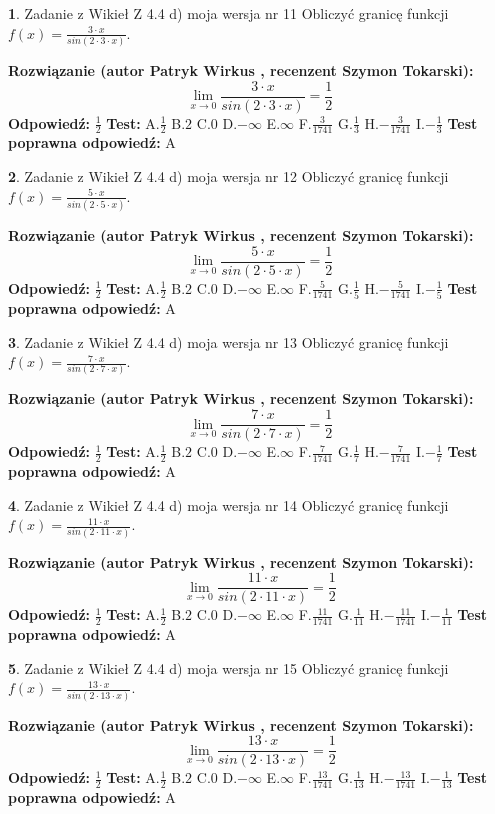 \documentclass[12pt, a4paper]{article}
\theoremstyle{definition} %
\newtheorem{zad}{}
\newcommand{\zadStart}[1]{\begin{zad}#1\newline}
\newcommand{\zadStop}{\end{zad}}
\newcommand{\rozwStart}[2]{\noindent \textbf{Rozwiązanie (autor #1 , recenzent #2): }\newline}
\newcommand{\rozwStop}{\newline}
\newcommand{\odpStart}{\noindent \textbf{Odpowiedź:}\newline}
\newcommand{\odpStop}{\newline}
\newcommand{\testStart}{\noindent \textbf{Test:}\newline}
\newcommand{\testStop}{\newline}
\newcommand{\kluczStart}{\noindent \textbf{Test poprawna odpowiedź:}\newline}
\newcommand{\kluczStop}{\newline}
\begin{document}
\zadStart{Zadanie z Wikieł Z 4.4 d) moja wersja nr 11}
Obliczyć granicę funkcji $f(x)=\frac{3\cdot x}{sin(2 \cdot3\cdot x)}$.
\zadStop
\rozwStart{Patryk Wirkus}{Szymon Tokarski}
$$\lim\limits_{x\to 0}\frac{3\cdot x}{sin(2 \cdot3\cdot x)}=\frac{1}{2}$$
\rozwStop
\odpStart
$\frac{1}{2}$
\odpStop
\testStart
A.$\frac{1}{2}$
B.$2$
C.$0$
D.$-\infty$
E.$\infty$
F.$\frac{3}{1741}$
G.$\frac{1}{3}$
H.$-\frac{3}{1741}$
I.$-\frac{1}{3}$
\testStop
\kluczStart
A
\kluczStop



\zadStart{Zadanie z Wikieł Z 4.4 d) moja wersja nr 12}
Obliczyć granicę funkcji $f(x)=\frac{5\cdot x}{sin(2 \cdot5\cdot x)}$.
\zadStop
\rozwStart{Patryk Wirkus}{Szymon Tokarski}
$$\lim\limits_{x\to 0}\frac{5\cdot x}{sin(2 \cdot5\cdot x)}=\frac{1}{2}$$
\rozwStop
\odpStart
$\frac{1}{2}$
\odpStop
\testStart
A.$\frac{1}{2}$
B.$2$
C.$0$
D.$-\infty$
E.$\infty$
F.$\frac{5}{1741}$
G.$\frac{1}{5}$
H.$-\frac{5}{1741}$
I.$-\frac{1}{5}$
\testStop
\kluczStart
A
\kluczStop



\zadStart{Zadanie z Wikieł Z 4.4 d) moja wersja nr 13}
Obliczyć granicę funkcji $f(x)=\frac{7\cdot x}{sin(2 \cdot7\cdot x)}$.
\zadStop
\rozwStart{Patryk Wirkus}{Szymon Tokarski}
$$\lim\limits_{x\to 0}\frac{7\cdot x}{sin(2 \cdot7\cdot x)}=\frac{1}{2}$$
\rozwStop
\odpStart
$\frac{1}{2}$
\odpStop
\testStart
A.$\frac{1}{2}$
B.$2$
C.$0$
D.$-\infty$
E.$\infty$
F.$\frac{7}{1741}$
G.$\frac{1}{7}$
H.$-\frac{7}{1741}$
I.$-\frac{1}{7}$
\testStop
\kluczStart
A
\kluczStop



\zadStart{Zadanie z Wikieł Z 4.4 d) moja wersja nr 14}
Obliczyć granicę funkcji $f(x)=\frac{11\cdot x}{sin(2 \cdot11\cdot x)}$.
\zadStop
\rozwStart{Patryk Wirkus}{Szymon Tokarski}
$$\lim\limits_{x\to 0}\frac{11\cdot x}{sin(2 \cdot11\cdot x)}=\frac{1}{2}$$
\rozwStop
\odpStart
$\frac{1}{2}$
\odpStop
\testStart
A.$\frac{1}{2}$
B.$2$
C.$0$
D.$-\infty$
E.$\infty$
F.$\frac{11}{1741}$
G.$\frac{1}{11}$
H.$-\frac{11}{1741}$
I.$-\frac{1}{11}$
\testStop
\kluczStart
A
\kluczStop



\zadStart{Zadanie z Wikieł Z 4.4 d) moja wersja nr 15}
Obliczyć granicę funkcji $f(x)=\frac{13\cdot x}{sin(2 \cdot13\cdot x)}$.
\zadStop
\rozwStart{Patryk Wirkus}{Szymon Tokarski}
$$\lim\limits_{x\to 0}\frac{13\cdot x}{sin(2 \cdot13\cdot x)}=\frac{1}{2}$$
\rozwStop
\odpStart
$\frac{1}{2}$
\odpStop
\testStart
A.$\frac{1}{2}$
B.$2$
C.$0$
D.$-\infty$
E.$\infty$
F.$\frac{13}{1741}$
G.$\frac{1}{13}$
H.$-\frac{13}{1741}$
I.$-\frac{1}{13}$
\testStop
\kluczStart
A
\kluczStop
\end{document}
